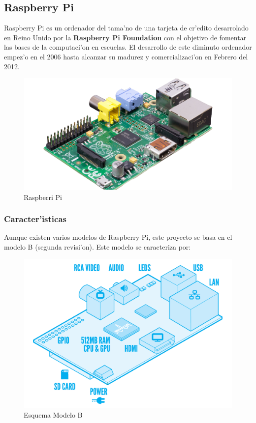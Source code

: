 \documentclass[twoside,12pt]{article}
\begin{document}
\subsection{Raspberry Pi}
Raspberry Pi es un ordenador del tama'no de una tarjeta de cr'edito desarrolado en Reino Unido por la \textbf{Raspberry Pi Foundation} con el objetivo de fomentar las bases de la computaci'on en escuelas. El desarrollo de este diminuto ordenador empez'o en el 2006 hasta alcanzar su madurez y comercializaci'on en Febrero del 2012. 

\begin{figure}[ht]
\centering
\includegraphics[scale=0.2]{images/raspi.png} 
\caption{Raspberri Pi}
\label{fig:Raspberry Pi}
\end{figure}

\subsubsection{Caracter'isticas}
Aunque existen varios modelos de Raspberry Pi, este proyecto se basa en el modelo B (segunda revisi'on). Este modelo se caracteriza por:

\begin{figure}[ht]
\centering
\includegraphics[scale=0.15]{images/RaspiModelB.png} 
\caption{Esquema Modelo B}
\label{fig:Esquema Modelo B}
\end{figure}
\end{document}
